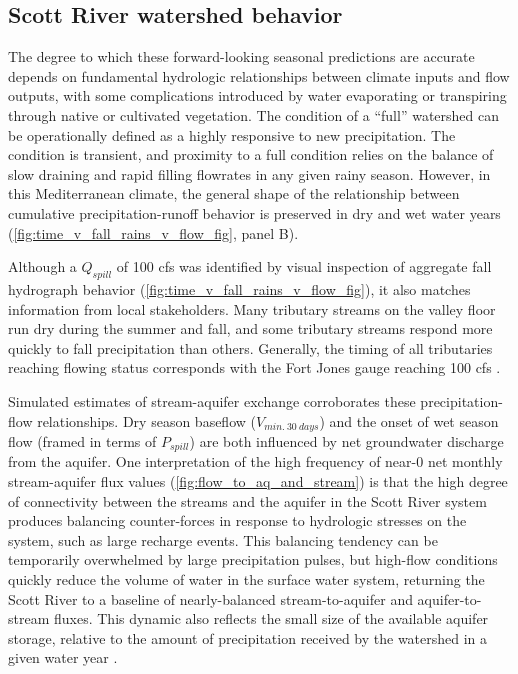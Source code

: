\documentclass[hess, manuscript]{copernicus}
\begin{document}
\subsection{Scott River watershed behavior}

The degree to which these forward-looking seasonal predictions are
accurate depends on fundamental hydrologic relationships between climate
inputs and flow outputs, with some complications introduced by water
evaporating or transpiring through native or cultivated vegetation. The
condition of a ``full'' watershed can be operationally defined as a
highly responsive to new precipitation. The condition is transient, and
proximity to a full condition relies on the balance of slow draining and
rapid filling flowrates in any given rainy season. However, in this
Mediterranean climate, the general shape of the relationship between
cumulative precipitation-runoff behavior is preserved in dry and wet
water years (\autoref{fig:time_v_fall_rains_v_flow_fig}, panel B).

Although a \(Q_{spill}\) of 100 cfs was identified by visual inspection
of aggregate fall hydrograph behavior
(\autoref{fig:time_v_fall_rains_v_flow_fig}), it also matches
information from local stakeholders. Many tributary streams on the
valley floor run dry during the summer and fall, and some tributary
streams respond more quickly to fall precipitation than others.
Generally, the timing of all tributaries reaching flowing status
corresponds with the Fort Jones gauge reaching 100 cfs
\citep{Sommarstrom2020}.

Simulated estimates of stream-aquifer exchange corroborates these
precipitation-flow relationships. Dry season baseflow
(\(V_{min.~30~days}\)) and the onset of wet season flow (framed in terms
of \(P_{spill}\)) are both influenced by net groundwater discharge from
the aquifer. One interpretation of the high frequency of near-0 net
monthly stream-aquifer flux values (\autoref{fig:flow_to_aq_and_stream})
is that the high degree of connectivity between the streams and the
aquifer in the Scott River system produces balancing counter-forces in
response to hydrologic stresses on the system, such as large recharge
events. This balancing tendency can be temporarily overwhelmed by large
precipitation pulses, but high-flow conditions quickly reduce the volume
of water in the surface water system, returning the Scott River to a
baseline of nearly-balanced stream-to-aquifer and aquifer-to-stream
fluxes. This dynamic also reflects the small size of the available
aquifer storage, relative to the amount of precipitation received by the
watershed in a given water year \citep{DWR2004}.
\end{document}

